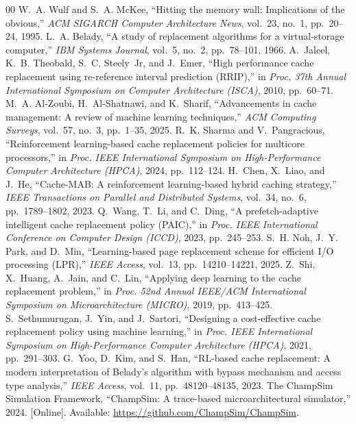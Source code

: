 \documentclass[conference]{IEEEtran}
\begin{document}
\begin{thebibliography}{00}
\footnotesize
\setlength{\itemsep}{1.0pt plus 0.5pt}
 W.~A. Wulf and S.~A. McKee, ``Hitting the memory wall: Implications of the obvious,'' \emph{ACM SIGARCH Computer Architecture News}, vol.~23, no.~1, pp.~20--24, 1995.
 L.~A. Belady, ``A study of replacement algorithms for a virtual-storage computer,'' \emph{IBM Systems Journal}, vol.~5, no.~2, pp.~78--101, 1966.
 A.~Jaleel, K.~B. Theobald, S.~C. Steely~Jr, and J.~Emer, ``High performance cache replacement using re-reference interval prediction (RRIP),'' in \emph{Proc. 37th Annual International Symposium on Computer Architecture (ISCA)}, 2010, pp.~60--71.
 M.~A. Al-Zoubi, H.~Al-Shatnawi, and K.~Sharif, ``Advancements in cache management: A review of machine learning techniques,'' \emph{ACM Computing Surveys}, vol.~57, no.~3, pp.~1--35, 2025.
 R.~K. Sharma and V.~Pangracious, ``Reinforcement learning-based cache replacement policies for multicore processors,'' in \emph{Proc. IEEE International Symposium on High-Performance Computer Architecture (HPCA)}, 2024, pp.~112--124.
 H.~Chen, X.~Liao, and J.~He, ``Cache-MAB: A reinforcement learning-based hybrid caching strategy,'' \emph{IEEE Transactions on Parallel and Distributed Systems}, vol.~34, no.~6, pp.~1789--1802, 2023.
 Q.~Wang, T.~Li, and C.~Ding, ``A prefetch-adaptive intelligent cache replacement policy (PAIC),'' in \emph{Proc. IEEE International Conference on Computer Design (ICCD)}, 2023, pp.~245--253.
 S.~H. Noh, J.~Y. Park, and D.~Min, ``Learning-based page replacement scheme for efficient I/O processing (LPR),'' \emph{IEEE Access}, vol.~13, pp.~14210--14221, 2025.
 Z.~Shi, X.~Huang, A.~Jain, and C.~Lin, ``Applying deep learning to the cache replacement problem,'' in \emph{Proc. 52nd Annual IEEE/ACM International Symposium on Microarchitecture (MICRO)}, 2019, pp.~413--425.
 S.~Sethumurugan, J.~Yin, and J.~Sartori, ``Designing a cost-effective cache replacement policy using machine learning,'' in \emph{Proc. IEEE International Symposium on High-Performance Computer Architecture (HPCA)}, 2021, pp.~291--303.
 G.~Yoo, D.~Kim, and S.~Han, ``RL-based cache replacement: A modern interpretation of Belady's algorithm with bypass mechanism and access type analysis,'' \emph{IEEE Access}, vol.~11, pp.~48120--48135, 2023.
 The ChampSim Simulation Framework, ``ChampSim: A trace-based microarchitectural simulator,'' 2024. [Online]. Available: \url{https://github.com/ChampSim/ChampSim}.
\end{thebibliography}
\end{document}
